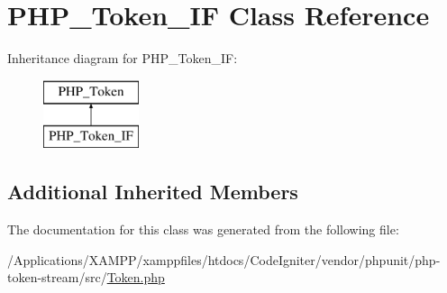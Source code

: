 \hypertarget{class_p_h_p___token___i_f}{}\section{P\+H\+P\+\_\+\+Token\+\_\+\+IF Class Reference}
\label{class_p_h_p___token___i_f}
Inheritance diagram for P\+H\+P\+\_\+\+Token\+\_\+\+IF\+:\begin{figure}[H]
\begin{center}
\leavevmode
\includegraphics[height=2.000000cm]{class_p_h_p___token___i_f}
\end{center}
\end{figure}
\subsection*{Additional Inherited Members}


The documentation for this class was generated from the following file\+:\begin{DoxyCompactItemize}
\item 
/\+Applications/\+X\+A\+M\+P\+P/xamppfiles/htdocs/\+Code\+Igniter/vendor/phpunit/php-\/token-\/stream/src/\mbox{\hyperlink{_token_8php}{Token.\+php}}\end{DoxyCompactItemize}

